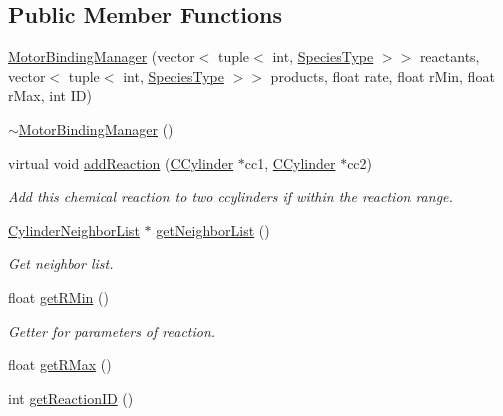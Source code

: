 \subsection*{Public Member Functions}
\begin{DoxyCompactItemize}
\item 
\hyperlink{classMotorBindingManager_a3303973f9014978791254c229da73610}{Motor\+Binding\+Manager} (vector$<$ tuple$<$ int, \hyperlink{Species_8h_a50651af47c56ea0e27235468d23542cf}{Species\+Type} $>$$>$ reactants, vector$<$ tuple$<$ int, \hyperlink{Species_8h_a50651af47c56ea0e27235468d23542cf}{Species\+Type} $>$$>$ products, float rate, float r\+Min, float r\+Max, int I\+D)
\item 
\hyperlink{classMotorBindingManager_a5a90a4f4ab35f33494d41d95d16fb8f0}{$\sim$\+Motor\+Binding\+Manager} ()
\item 
virtual void \hyperlink{classMotorBindingManager_a7620868b2035b311bd15b0fec7af1bd5}{add\+Reaction} (\hyperlink{classCCylinder}{C\+Cylinder} $\ast$cc1, \hyperlink{classCCylinder}{C\+Cylinder} $\ast$cc2)
\begin{DoxyCompactList}\small\item\em Add this chemical reaction to two ccylinders if within the reaction range. \end{DoxyCompactList}\item 
\hyperlink{classCylinderNeighborList}{Cylinder\+Neighbor\+List} $\ast$ \hyperlink{classCylinderNLContainer_afce343b3251cf0ed087cf5a62fb6aaee}{get\+Neighbor\+List} ()
\begin{DoxyCompactList}\small\item\em Get neighbor list. \end{DoxyCompactList}\end{DoxyCompactItemize}
{\bf }\par
\begin{DoxyCompactItemize}
\item 
float \hyperlink{classCrossFilamentRxnManager_aeb9207c18bb40c33d9c8fe99a006401d}{get\+R\+Min} ()
\begin{DoxyCompactList}\small\item\em Getter for parameters of reaction. \end{DoxyCompactList}\item 
float \hyperlink{classCrossFilamentRxnManager_a7fa04502185124176a72fb2f3965c698}{get\+R\+Max} ()
\item 
int \hyperlink{classCrossFilamentRxnManager_aa5527049ea757ea2b22fca486d3bf08d}{get\+Reaction\+I\+D} ()
\end{DoxyCompactItemize}

